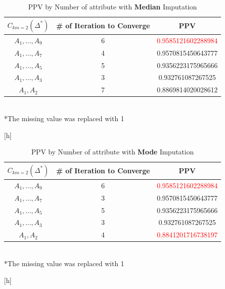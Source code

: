\documentclass{article}
\begin{document}
\begin{enumerate}
			\begin{table}[h]
				\caption{PPV by Number of attribute with \textbf{Median} Imputation}
				\centering
				\begin{tabular}{c|c c}
					\\
					\hline
					$C_{km=2} (\Delta^*)$ & \# of Iteration to Converge & PPV \\
					\hline
					$A_1, . . . , A_9$ & 6 & \textcolor{red}{0.9585121602288984}\\
					$A_1, . . . , A_7$ & 4 & 0.9570815450643777\\
					$A_1, . . . , A_5$ & 5 & 0.9356223175965666\\
					$A_1, . . . , A_3$ & 3 & 0.932761087267525\\
					$A_1, A_2$  & 7 & 0.8869814020028612\\
					\hline	
				\end{tabular}\\
				*The missing value was replaced with 1
			\end{table}[h] \\	


			\begin{table}[h]
				\caption{PPV by Number of attribute with \textbf{Mode} Imputation}
				\centering
				\begin{tabular}{c|c c}
					\\
					\hline
					$C_{km=2} (\Delta^*)$ & \# of Iteration to Converge & PPV \\
					\hline
					$A_1, . . . , A_9$ & 6 & \textcolor{red}{0.9585121602288984}\\
					$A_1, . . . , A_7$ & 3 & 0.9570815450643777\\
					$A_1, . . . , A_5$ & 5 & 0.9356223175965666\\
					$A_1, . . . , A_3$ & 3 & 0.932761087267525\\
					$A_1, A_2$  & 4 & \textcolor{red}{0.8841201716738197}\\
					\hline	
				\end{tabular}\\
				*The missing value was replaced with 1
			\end{table}[h] \\	



\end{enumerate}
\end{document}
